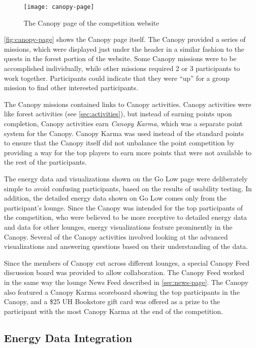 \begin{figure}[htbp]
	\centering
		\texttt{[image: canopy-page]}
		\caption{The Canopy page of the competition website}
\label{fig:canopy-page}
\end{figure}

\autoref{fig:canopy-page} shows the Canopy page itself. The Canopy provided a series of missions, which were displayed just under the header in a similar fashion to the quests in the forest portion of the website. Some Canopy missions were to be accomplished individually, while other missions required 2 or 3 participants to work together. Participants could indicate that they were ``up'' for a group mission to find other interested participants.

The Canopy missions contained links to Canopy activities. Canopy activities were like forest activities (see \autoref{sec:activities}), but instead of earning points upon completion, Canopy activities earn \emph{Canopy Karma}, which was a separate point system for the Canopy. Canopy Karma was used instead of the standard points to ensure that the Canopy itself did not unbalance the point competition by providing a way for the top players to earn more points that were not available to the rest of the participants.

The energy data and visualizations shown on the Go Low page were deliberately simple to avoid confusing participants, based on the results of usability testing. In addition, the detailed energy data shown on Go Low comes only from the participant's lounge. Since the Canopy was intended for the top participants of the competition, who were believed to be more receptive to detailed energy data and data for other lounges, energy visualizations feature prominently in the Canopy. Several of the Canopy activities involved looking at the advanced visualizations and answering questions based on their understanding of the data.

Since the members of Canopy cut across different lounges, a special Canopy Feed discussion board was provided to allow collaboration. The Canopy Feed worked in the same way the lounge News Feed described in \autoref{sec:news-page}. The Canopy also featured a Canopy Karma scoreboard showing the top participants in the Canopy, and a \$25 UH Bookstore gift card was offered as a prize to the participant with the most Canopy Karma at the end of the competition.


\subsection{Energy Data Integration}
\label{sec:energy-data-integration}

